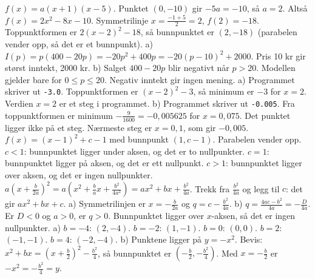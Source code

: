  $f(x) = a(x + 1)(x - 5)$. Punktet $(0, -10)$ gir $-5a = -10$, så $a = 2$. Altså $f(x) = 2x^2 - 8x - 10$. Symmetrilinje $x = \frac{-1 + 5}{2} = 2$, $f(2) = -18$. Toppunktformen er $2(x - 2)^2 - 18$, så bunnpunktet er $(2, -18)$ (parabelen vender opp, så det er et bunnpunkt).
 a) $I(p) = p(400 - 20p) = -20p^2 + 400p = -20(p - 10)^2 + 2000$. Pris 10 kr gir størst inntekt, 2000 kr.
b) Salget $400 - 20p$ blir negativt når $p > 20$. Modellen gjelder bare for $0 \le p \le 20$. Negativ inntekt gir ingen mening.
 a) Programmet skriver ut \texttt{-3.0}. Toppunktformen er $(x - 2)^2 - 3$, så minimum er $-3$ for $x = 2$. Verdien $x = 2$ er et steg i programmet.
b) Programmet skriver ut \texttt{-0.005}. Fra toppunktformen er minimum $-\frac{9}{1600} = -0{,}005625$ for $x = 0{,}075$. Det punktet ligger ikke på et steg. Nærmeste steg er $x = 0{,}1$, som gir $-0{,}005$.
 $f(x) = (x - 1)^2 + c - 1$ med bunnpunkt $(1, c - 1)$. Parabelen vender opp.
$c < 1$: bunnpunktet ligger under aksen, og det er to nullpunkter. $c = 1$: bunnpunktet ligger på aksen, og det er ett nullpunkt. $c > 1$: bunnpunktet ligger over aksen, og det er ingen nullpunkter.
 $a\left(x + \frac{b}{2a}\right)^2 = a\left(x^2 + \frac{b}{a}x + \frac{b^2}{4a^2}\right) = ax^2 + bx + \frac{b^2}{4a}$. Trekk fra $\frac{b^2}{4a}$ og legg til $c$: det gir $ax^2 + bx + c$.
a) Symmetrilinjen er $x = -\frac{b}{2a}$ og $q = c - \frac{b^2}{4a}$.
b) $q = \frac{4ac - b^2}{4a} = -\frac{D}{4a}$. Er $D < 0$ og $a > 0$, er $q > 0$. Bunnpunktet ligger over $x$-aksen, så det er ingen nullpunkter.
 a) $b = -4$: $(2, -4)$. $b = -2$: $(1, -1)$. $b = 0$: $(0, 0)$. $b = 2$: $(-1, -1)$. $b = 4$: $(-2, -4)$.
b) Punktene ligger på $y = -x^2$. Bevis: $x^2 + bx = (x + \frac{b}{2})^2 - \frac{b^2}{4}$, så bunnpunktet er $(-\frac{b}{2}, -\frac{b^2}{4})$. Med $x = -\frac{b}{2}$ er $-x^2 = -\frac{b^2}{4} = y$.

